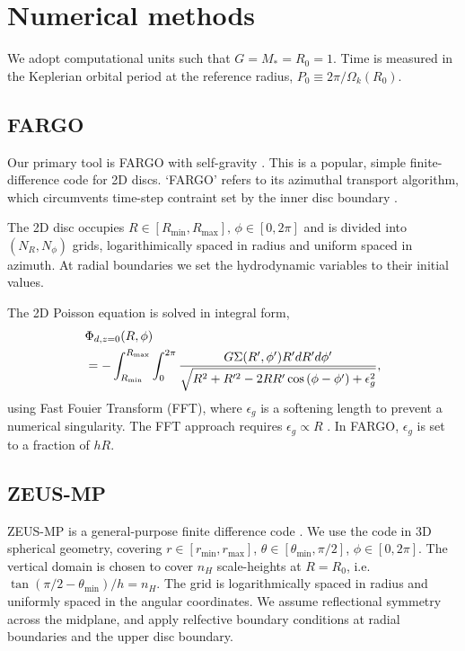 \section{Numerical methods}\label{methods}
We adopt computational units such that $G=M_*=R_0=1$. Time is measured
in the Keplerian orbital period at the reference radius, $P_0\equiv 
2\pi/\Omega_k(R_0)$.  

\subsection{FARGO}
Our primary tool is FARGO with self-gravity \citep{baruteau08}. This
is a popular, simple finite-difference code for 2D discs. `FARGO' refers
to its azimuthal transport algorithm, which circumvents time-step
contraint set by the inner disc boundary \citep{masset00a,masset00b}. 

The 2D disc occupies
$R\in[R_\mathrm{min},R_\mathrm{max}],\,\phi\in[0,2\pi]$ and is 
divided into $(N_R,N_\phi)$ grids, logarithimically spaced in radius and
uniform spaced in azimuth. At radial boundaries we set the
hydrodynamic variables to their initial values.   

The 2D Poisson equation is solved in integral form, 
\begin{align}\label{2d_grav}
  &\Phi_{d,z=0}(R,\phi) \notag \\
  &=-\int_{R_\mathrm{min}}^{R_\mathrm{max}} \int_0^{2\pi}
  \frac{G\Sigma(R^\prime,\phi^\prime)R^\prime dR^\prime d\phi^\prime}{\sqrt{R^2+R^{\prime 2} -
      2RR^\prime\cos{(\phi - \phi^\prime)} + \epsilon_g^2}}, 
\end{align}
using Fast Fouier Transform (FFT), where $\epsilon_g$ is a softening
length to prevent a numerical singularity. The FFT approach requires
$\epsilon_g\propto R$ \citep{baruteau08}. In FARGO, $\epsilon_g$ is
set to a fraction of $hR$.  

\subsection{ZEUS-MP}
ZEUS-MP  is a general-purpose finite difference
code \citep{hayes06}. We use the code in 3D spherical geometry, covering
$r\in[r_\mathrm{min},r_\mathrm{max}]$, $\theta\in[\theta_\mathrm{min},\pi/2]$,
$\phi\in[0,2\pi]$. The vertical domain is chosen to cover $n_H$
scale-heights at $R=R_0$, i.e. $\tan{(\pi/2 - \theta_\mathrm{min})}/h=n_H$. 
The grid is logarithmically spaced in radius and uniformly spaced in the angular
coordinates. We assume reflectional symmetry across the midplane, and
apply relfective boundary conditions at radial boundaries and the
upper disc boundary.  

